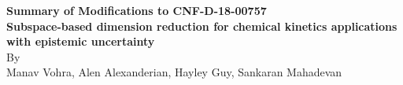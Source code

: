 \documentclass[11pt,final]{article}
\begin{document}
\begin{center}
{\bf Summary of Modifications to CNF-D-18-00757}\\[6pt]
{\bf Subspace-based dimension reduction for chemical kinetics applications with epistemic uncertainty}\\[6pt]
By \\
Manav Vohra, Alen Alexanderian, Hayley Guy, Sankaran Mahadevan 
\end{center}

\baselineskip=22pt


\vspace*{1in}


\clearpage
\end{document}
